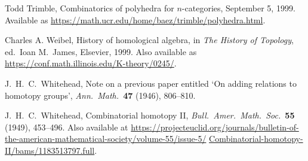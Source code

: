 \documentclass[reqno]{amsart}
\theoremstyle{definition}
\begin{document}
\begin{thebibliography}{99}
Todd Trimble, Combinatorics of polyhedra for $n$-categories, September 5, 1999.  Available as
\href{https://math.ucr.edu/home/baez/trimble/polyhedra.html}{https://math.ucr.edu/home/baez/trimble/polyhedra.html}.

Charles A. Weibel, History of homological algebra, in \textsl{The History of Topology}, ed.\ Ioan M.\ James, Elsevier, 1999.   Also available as \href{https://conf.math.illinois.edu/K-theory/0245/}{https://conf.math.illinois.edu/K-theory/0245/}.

J.\ H.\ C.\ Whitehead, Note on a previous paper entitled `On adding relations to homotopy groups', {\sl Ann.\ Math.\ }\textbf{47} (1946), 806--810.

J.\ H.\ C.\ Whitehead, Combinatorial homotopy II, {\sl Bull.\ Amer.\
Math.\ Soc.\ }\textbf{55} (1949), 453--496.  Also available at 
\href{https://projecteuclid.org/journals/bulletin-of-the-american-mathematical-society/volume-55/issue-5/Combinatorial-homotopy-II/bams/1183513797.full}{https://projecteuclid.org/journals/bulletin-of-the-american-mathematical-society/volume-55/issue-5/} \hfill \break \href{https://projecteuclid.org/journals/bulletin-of-the-american-mathematical-society/volume-55/issue-5/Combinatorial-homotopy-II/bams/1183513797.full}{Combinatorial-homotopy-II/bams/1183513797.full}.

\end{thebibliography}
\end{document}
